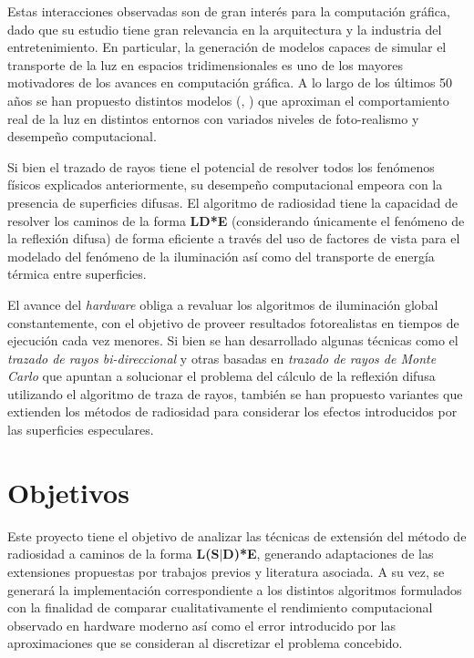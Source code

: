 Estas interacciones observadas son de gran interés para la computación gráfica, dado que su estudio tiene gran relevancia en la arquitectura y la industria del entretenimiento. En particular, la generación de modelos capaces de simular el transporte de la luz en espacios tridimensionales es uno de los mayores motivadores de los avances en computación gráfica. A lo largo de los últimos 50 años se han propuesto distintos modelos (\cite{Kajiya}, \cite{Cohen}) que aproximan el comportamiento real de la luz en distintos entornos con variados niveles de foto-realismo y desempeño computacional.

Si bien el trazado de rayos tiene el potencial de resolver todos los fenómenos físicos explicados anteriormente, su desempeño computacional empeora con la presencia de superficies difusas. El algoritmo de radiosidad tiene la capacidad de resolver los caminos de la forma \textbf{LD*E} (considerando únicamente el fenómeno de la reflexión difusa) de forma eficiente a través del uso de factores de vista para el modelado del fenómeno de la iluminación así como del transporte de energía térmica entre superficies.

El avance del \textit{hardware} obliga a revaluar los algoritmos de iluminación global constantemente, con el objetivo de proveer resultados fotorealistas en tiempos de ejecución cada vez menores. Si bien se han desarrollado algunas técnicas como el \textit{trazado de rayos bi-direccional} y otras basadas en \textit{trazado de rayos de Monte Carlo} que apuntan a solucionar el problema del cálculo de la reflexión difusa utilizando el algoritmo de traza de rayos, también se han propuesto variantes que extienden los métodos de radiosidad para considerar los efectos introducidos por las superficies especulares.


\section{Objetivos}
\label{sec:objetivos}

Este proyecto tiene el objetivo de analizar las técnicas de extensión del método de radiosidad a caminos de la forma \textbf{L(S$|$D)*E}, generando adaptaciones de las extensiones propuestas por trabajos previos y literatura asociada. A su vez, se generará la implementación correspondiente a los distintos algoritmos formulados con la finalidad de comparar cualitativamente el rendimiento computacional observado en hardware moderno así como el error introducido por las aproximaciones que se consideran al discretizar el problema concebido.

